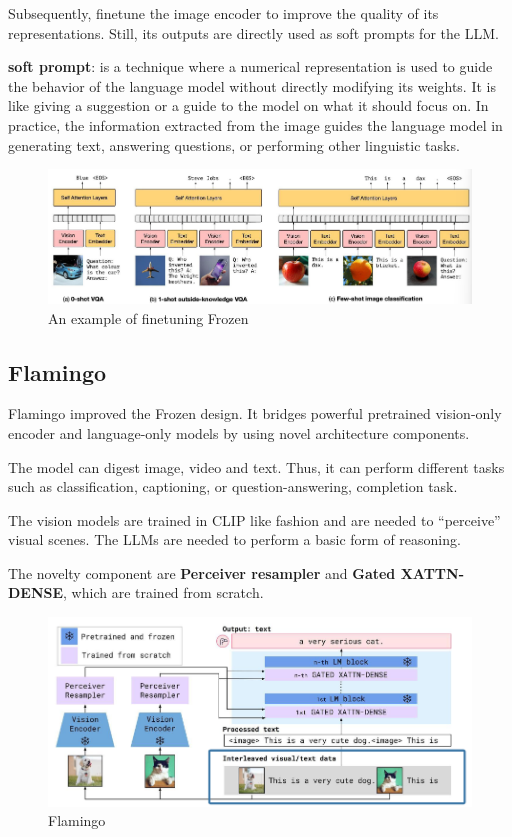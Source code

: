 Subsequently, finetune the image encoder to improve the quality of its representations. Still, its outputs are directly used as soft prompts for the LLM. 

\textbf{soft prompt}: is a technique where a numerical representation is used to guide the behavior of the language model without directly modifying its weights. It is like giving a suggestion or a guide to the model on what it should focus on. In practice, the information extracted from the image guides the language model in generating text, answering questions, or performing other linguistic tasks.



\begin{figure}[H]
    \centering
    \includegraphics[width=1\linewidth]{tikz/Flaming 2.png}
    \caption{An example of finetuning Frozen}
    \label{fig:Frozen-finetune}
\end{figure}


\subsection{Flamingo}
Flamingo improved the Frozen design. It bridges powerful pretrained vision-only encoder and language-only models by using novel architecture components.

The model can digest image, video and text. Thus,  it can perform different tasks such as classification, captioning, or question-answering, completion task.

The vision models are trained in CLIP like fashion and are needed to “perceive” visual scenes. The LLMs are needed to perform a basic form of reasoning.

The novelty component are \textbf{Perceiver resampler} and \textbf{Gated XATTN-DENSE}, which are trained from scratch.


\begin{figure}[H]
    \centering
    \includegraphics[width=1\linewidth]{tikz/Flamingo 3.png}
    \caption{Flamingo}
    \label{fig:Flamingo}
\end{figure}

